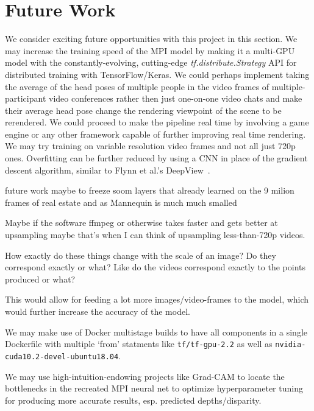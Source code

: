 \section{Future Work}\label{sec:future-work}

We consider exciting future opportunities with this project in this section. We may increase the training speed of the MPI model by making it a multi-GPU model with the constantly-evolving, cutting-edge \textit{tf.distribute.Strategy} API for distributed training with TensorFlow/Keras. We could perhaps implement taking the average of the head poses of multiple people in the video frames of multiple-participant video conferences rather then just one-on-one video chats and make their average head pose change the rendering viewpoint of the scene to be rerendered. We could proceed to make the pipeline real time by involving a game engine or any other framework capable of further improving real time rendering. We may try training on variable resolution video frames and not all just 720p ones. Overfitting can be further reduced by using a CNN in place of the gradient descent algorithm, similar to Flynn et al.'s DeepView~\cite{flynn_deepview_2019}.

future work maybe to freeze soom layers that already learned on the 
9 milion frames of real estate and as Mannequin is much much smalled 

Maybe if the software ffmpeg or otherwise takes faster and gets better at upsampling maybe that's when I can think of upsampling less-than-720p videos.

How exactly do these things change with the scale of an image? 
Do they correspond exactly or what? Like do the videos correspond exactly to the points produced or what?

This would allow for feeding a lot more images/video-frames to the model, which would further increase the accuracy of the model.

We may make use of Docker multistage builds to have all components in a single Dockerfile with multiple `from' statments like \texttt{tf/tf-gpu-2.2} as well as \texttt{nvidia-cuda10.2-devel-ubuntu18.04}.

We may use high-intuition-endowing projects like Grad-CAM to locate the bottlenecks in the recreated MPI neural net to optimize hyperparameter tuning for producing more accurate results, esp. predicted depths/disparity.


